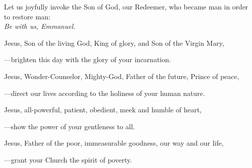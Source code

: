 \intercessions\indent

\begin{hangpar}

Let us joyfully invoke the Son of God, our Redeemer, who became man in order to restore man:\\
\emph{Be with us, Emmanuel.}

\medskip Jesus, Son of the living God, King of glory, and Son of the Virgin Mary,

{\color{red}---\thinspace}brighten this day with the glory of your incarnation.

\medskip Jesus, Wonder-Counselor, Mighty-God, Father of the future, Prince of peace,

{\color{red}---\thinspace}direct our lives according to the holiness of your human nature.

\medskip Jesus, all-powerful, patient, obedient, meek and humble of heart,

{\color{red}---\thinspace}show the power of your gentleness to all.

\medskip Jesus, Father of the poor, immeasurable goodness, our way and our life,

{\color{red}---\thinspace}grant your Church the spirit of poverty.

\medskip

\end{hangpar}
